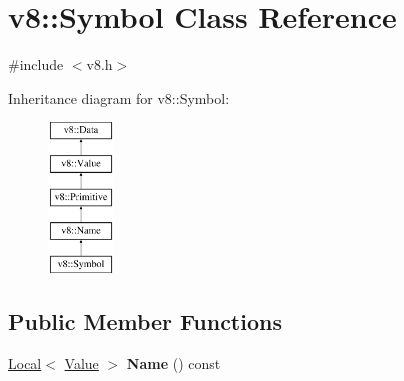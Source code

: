 \hypertarget{classv8_1_1Symbol}{\section{v8\-:\-:Symbol Class Reference}
\label{classv8_1_1Symbol}
}


{\ttfamily \#include $<$v8.\-h$>$}

Inheritance diagram for v8\-:\-:Symbol\-:\begin{figure}[H]
\begin{center}
\leavevmode
\includegraphics[height=4.000000cm]{classv8_1_1Symbol}
\end{center}
\end{figure}
\subsection*{Public Member Functions}
\begin{DoxyCompactItemize}
\item 
\hypertarget{classv8_1_1Symbol_af1c1ccf079ac99e0db858c30e6458587}{\hyperlink{classv8_1_1Local}{Local}$<$ \hyperlink{classv8_1_1Value}{Value} $>$ {\bfseries Name} () const }\label{classv8_1_1Symbol_af1c1ccf079ac99e0db858c30e6458587}

\end{DoxyCompactItemize}
